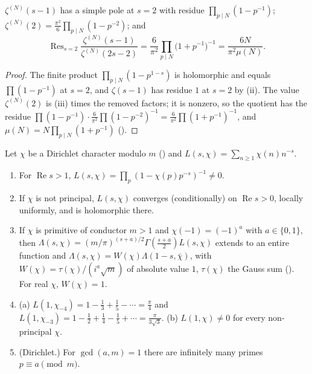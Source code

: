 \begin{proposition}\label{prop:lfunctions:partial-zeta}
$\zeta^{(N)}(s-1)$ has a simple pole at $s=2$ with residue $\prod_{p\mid N}(1-p^{-1})$; $\zeta^{(N)}(2)=\frac{\pi^2}6\prod_{p\mid N}(1-p^{-2})$; and
\[
\operatorname{Res}_{s=2}\frac{\zeta^{(N)}(s-1)}{\zeta^{(N)}(2s-2)}=\frac6{\pi^2}\prod_{p\mid N}\bigl(1+p^{-1}\bigr)^{-1}=\frac{6N}{\pi^2\mu(N)}.
\]
\end{proposition}

\begin{proof}
The finite product $\prod_{p\mid N}(1-p^{1-s})$ is holomorphic and equals $\prod(1-p^{-1})$ at $s=2$, and $\zeta(s-1)$ has residue $1$ at $s=2$ by
(ii). The value $\zeta^{(N)}(2)$ is (iii) times the removed factors; it is nonzero, so the quotient has the residue
$\prod(1-p^{-1})\cdot\frac6{\pi^2}\prod(1-p^{-2})^{-1}=\frac6{\pi^2}\prod(1+p^{-1})^{-1}$, and $\mu(N)=N\prod_{p\mid N}(1+p^{-1})$ ().
\end{proof}

\begin{theorem}\label{thm:lfunctions:dirichlet-L}
Let $\chi$ be a Dirichlet character modulo $m$ () and $L(s,\chi)=\sum_{n\ge1}\chi(n)n^{-s}$.
\begin{enumerate}[label=(\roman*)]
\item For $\operatorname{Re}s>1$, $L(s,\chi)=\prod_p(1-\chi(p)p^{-s})^{-1}\ne0$.
\item If $\chi$ is not principal, $L(s,\chi)$ converges (conditionally) on $\operatorname{Re}s>0$, locally uniformly, and is holomorphic there.
\item If $\chi$ is primitive of conductor $m>1$ and $\chi(-1)=(-1)^a$ with $a\in\{0,1\}$, then $\Lambda(s,\chi)=(m/\pi)^{(s+a)/2}\Gamma(\frac{s+a}2)L(s,\chi)$ extends to an entire
function and $\Lambda(s,\chi)=W(\chi)\Lambda(1-s,\bar\chi)$, with $W(\chi)=\tau(\chi)/(i^a\sqrt m)$ of absolute value $1$, $\tau(\chi)$ the Gauss sum (). For real
$\chi$, $W(\chi)=1$.
\item (a) $L(1,\chi_{-4})=1-\frac13+\frac15-\cdots=\frac\pi4$ and $L(1,\chi_{-3})=1-\frac12+\frac14-\frac15+\cdots=\frac\pi{3\sqrt3}$. (b) $L(1,\chi)\ne0$ for every non-principal $\chi$.
\item (Dirichlet.) For $\gcd(a,m)=1$ there are infinitely many primes $p\equiv a\pmod m$.
\end{enumerate}
\end{theorem}


